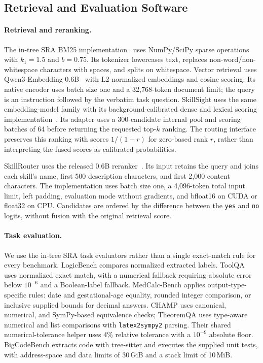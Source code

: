 \subsection{Retrieval and Evaluation Software}
\label{app:implementation-software}
\paragraph{Retrieval and reranking.}
The in-tree SRA BM25 implementation~\citep{robertson2009bm25} uses NumPy/SciPy sparse operations with $k_1=1.5$ and $b=0.75$. Its tokenizer lowercases text, replaces non-word/non-whitespace characters with spaces, and splits on whitespace. Vector retrieval uses Qwen3-Embedding-0.6B~\citep{zhang2025qwen3embedding} with L2-normalized embeddings and cosine scoring. Its native encoder uses batch size one and a 32,768-token document limit; the query is an instruction followed by the verbatim task question. SkillSight uses the same embedding-model family with its background-calibrated dense and lexical scoring implementation~\citep{xiao2026skillsightcalibratinggenericcontent}. Its adapter uses a 300-candidate internal pool and scoring batches of 64 before returning the requested top-$k$ ranking. The routing interface preserves this ranking with scores $1/(1+r)$ for zero-based rank $r$, rather than interpreting the fused scores as calibrated probabilities.

SkillRouter uses the released 0.6B reranker~\citep{zheng2026skillrouter}. Its input retains the query and joins each skill's name, first 500 description characters, and first 2,000 content characters. The implementation uses batch size one, a 4,096-token total input limit, left padding, evaluation mode without gradients, and bfloat16 on CUDA or float32 on CPU. Candidates are ordered by the difference between the \texttt{yes} and \texttt{no} logits, without fusion with the original retrieval score.

\paragraph{Task evaluation.}
We use the in-tree SRA task evaluators rather than a single exact-match rule for every benchmark. LogicBench compares normalized extracted labels. ToolQA uses normalized exact match, with a numerical fallback requiring absolute error below $10^{-6}$ and a Boolean-label fallback. MedCalc-Bench applies output-type-specific rules: date and gestational-age equality, rounded integer comparison, or inclusive supplied bounds for decimal answers. CHAMP uses canonical, numerical, and SymPy-based equivalence checks; TheoremQA uses type-aware numerical and list comparisons with \texttt{latex2sympy2} parsing. Their shared numerical-tolerance helper uses 4\% relative tolerance with a $10^{-9}$ absolute floor. BigCodeBench extracts code with tree-sitter and executes the supplied unit tests, with address-space and data limits of 30\,GiB and a stack limit of 10\,MiB.

